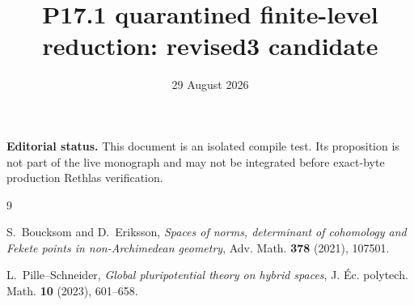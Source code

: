 \documentclass[11pt]{article}
\title{P17.1 quarantined finite-level reduction: revised3 candidate}
\author{}
\date{29 August 2026}
\theoremstyle{remark}
\begin{document}
\maketitle

\noindent
\textbf{Editorial status.}
This document is an isolated compile test. Its proposition is not part of
the live monograph and may not be integrated before exact-byte production
Rethlas verification.




\begin{thebibliography}{9}

S.~Boucksom and D.~Eriksson,
\emph{Spaces of norms, determinant of cohomology and Fekete points in
non-Archimedean geometry}, Adv. Math. \textbf{378} (2021), 107501.

L.~Pille--Schneider,
\emph{Global pluripotential theory on hybrid spaces},
J. \'{E}c. polytech. Math. \textbf{10} (2023), 601--658.

\end{thebibliography}
\end{document}
